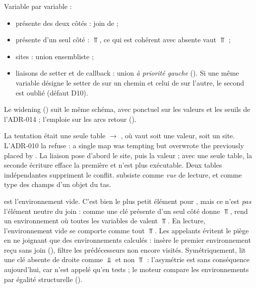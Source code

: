 
Variable par variable :
\begin{itemize}
  \item présente des deux côtés : join de  ;
  \item présente d'un seul côté : $\Top$, ce qui est cohérent avec
    \og absente vaut $\Top$\fg{} ;
  \item sites : union ensembliste ;
  \item liaisons de setter et de callback : union \emph{à priorité gauche}
    (). Si une même variable désigne le setter
    de  sur un chemin et celui de  sur l'autre, le second
    est oublié (défaut D10).
\end{itemize}
Le widening  ()
suit le même schéma, avec  ponctuel sur les valeurs et les
seuils de l'ADR-014 ;  l'emploie sur les arcs retour
().

\begin{decision}
  La tentation était une seule table  $\to$ , où
   vaut soit une valeur, soit un site. L'ADR-010 la refuse :
  \og a single map  was tempting but
   overwrote the  previously placed by
  \fg{}. La liaison 
  pose d'abord le site, puis la valeur ; avec une seule table, la seconde
  écriture efface la première et  n'est plus exécutable. Deux
  tables indépendantes suppriment le conflit.  subsiste comme
  \emph{vue} de lecture, et comme type des champs d'un objet du tas.
\end{decision}

\begin{piege}
   est l'environnement vide. C'est bien le plus
  petit élément pour , mais ce n'est \emph{pas} l'élément neutre du
  join : comme une clé présente d'un seul côté donne $\Top$,
   rend un environnement où toutes les variables de
   valent $\Top$. En lecture, l'environnement vide se comporte comme
  \og tout $\Top$\fg{}. Les appelants évitent le piège en ne joignant que des
  environnements calculés :  insère le premier
  environnement reçu sans join (),
   filtre les prédécesseurs non encore visités.
  Symétriquement,  lit une clé absente de droite comme $\Bot$ et
  non $\Top$ : l'asymétrie est sans conséquence aujourd'hui, car
   n'est appelé qu'en tests ; le moteur compare les
  environnements par égalité structurelle
  ().
\end{piege}

